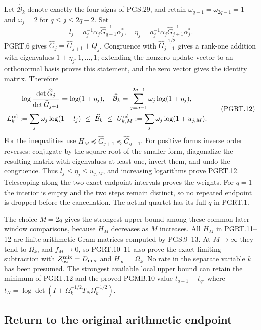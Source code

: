 Let $\widehat{\mathcal B}_k$ denote exactly the four signs of PGS.29,
and retain $\omega_{q-1}=\omega_{2q-1}=1$ and $\omega_j=2$
for $q\leq j\leq2q-2$. Set
\[
 l_j=a_j^{-1}\alpha_j\widehat G_{q-1}^{-1}\alpha_j^*,
 \quad\eta_j=a_j^{-1}\alpha_j\widehat G_{j+1}^{-1}\alpha_j^*.
\]
PGRT.6 gives $\widehat G_j=\widehat G_{j+1}+Q_j$.
Congruence with $\widehat G_{j+1}^{-1/2}$ gives a rank-one
addition with eigenvalues $1+\eta_j,1,\ldots,1$; extending the
nonzero update vector to an orthonormal basis proves this statement,
and the zero vector gives the identity matrix. Therefore
\[
\begin{gathered}
 \log\frac{\det\widehat G_j}{\det\widehat G_{j+1}}
       =\log(1+\eta_j),\quad
 \widehat{\mathcal B}_k=
                  \sum_{j=q-1}^{2q-1}\omega_j\log(1+\eta_j),\\
 L_k^{\rm rel}:=\sum_j\omega_j\log(1+l_j)
 \ \leq\ \widehat{\mathcal B}_k\ \leq\
 U_{k,M}^{\rm rel}:=\sum_j\omega_j\log(1+u_{j,M}).
\end{gathered}
\tag{PGRT.12}\label{GraphV2:eq:pgrt-endpoint-bounds}
\]
For the inequalities use
$H_M\preceq\widehat G_{j+1}\preceq\widehat G_{q-1}$.
For positive forms inverse order reverses: conjugate by the square
root of the smaller form, diagonalize the resulting matrix with
eigenvalues at least one, invert them, and undo the congruence.
Thus $l_j\leq\eta_j\leq u_{j,M}$, and increasing logarithms
prove PGRT.12. Telescoping along the two exact endpoint intervals
proves the weights. For $q=1$ the interior is empty and the two
steps remain distinct, so no repeated endpoint is dropped before
the cancellation. The actual quartet has its full $q$ in PGRT.1.

The choice $M=2q$ gives the strongest upper bound among these
common later-window comparisons, because $H_M$ decreases as $M$
increases. All $H_M$ in PGRT.11--12 are finite arithmetic Gram
matrices computed by PGS.9--13. At $M\to\infty$ they tend to
$\Omega_k$, and $f_M\to0$, so PGRT.10--11 also prove the exact
limiting subtraction with $Z_\infty^{\rm mix}=D_{\rm mix}$ and
$H_\infty=\Omega_k$. No rate in the separate variable $k$ has
been presumed. The strongest available local upper bound can
retain the minimum of PGRT.12 and the proved PGMB.10 value
$t_{q-1}+t_q$, where $t_N=\log\det(I+\Omega_k^{-1/2}T_N\Omega_k^{-1/2})$.

\subsection{Return to the original arithmetic endpoint}


